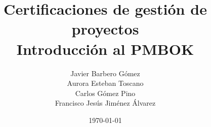\documentclass{beamer}
\title[Certificaciones de gestión de proyectos]{Certificaciones de gestión de proyectos \\ Introducción al PMBOK} %
\author[]{Javier Barbero Gómez \\ Aurora Esteban Toscano \\ Carlos Gómez Pino \\ Francisco Jesús Jiménez Álvarez} %
\institute[Universidad de Córdoba] %
{
	Universidad de Córdoba \\ %
	Grado en Ingeniería Informática \\
	Proyectos
	\medskip
}
\date{\today} %
\begin{document}
	
	\begin{frame}
		\titlepage %
	\end{frame}
	
	\begin{frame}
		\tableofcontents
	\end{frame}
	
	
	
	
	
	
\end{document}
